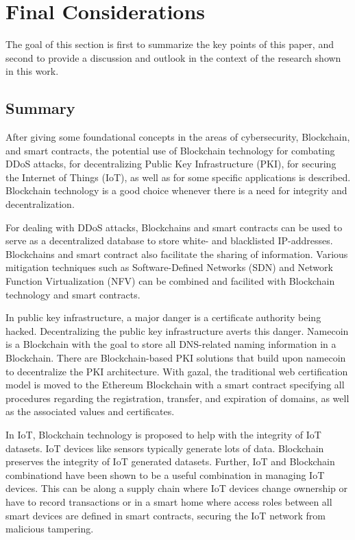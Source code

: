 \section{Final Considerations}

The goal of this section is first to summarize the key points of this paper, and second to provide a discussion and outlook in the context of the research shown in this work.

\subsection{Summary}

After giving some foundational concepts in the areas of cybersecurity, Blockchain, and smart contracts, the potential use of Blockchain technology for combating DDoS attacks, for decentralizing Public Key Infrastructure (PKI), for securing the Internet of Things (IoT), as well as for some specific applications is described. Blockchain technology is a good choice whenever there is a need for integrity and decentralization.

For dealing with DDoS attacks, Blockchains and smart contracts can be used to serve as a decentralized database to store white- and blacklisted IP-addresses. Blockchains and smart contract also facilitate the sharing of information.
Various mitigation techniques such as Software-Defined Networks (SDN) and Network Function Virtualization (NFV) can be combined and facilited with Blockchain technology and smart contracts.

In public key infrastructure, a major danger is a certificate authority being hacked. Decentralizing the public key infrastructure averts this danger. Namecoin is a Blockchain with the goal to store all DNS-related naming information in a Blockchain. There are Blockchain-based PKI solutions that build upon namecoin to decentralize the PKI architecture.
With gazal, the traditional web certification model is moved to the Ethereum Blockchain with a smart contract specifying all procedures regarding the registration, transfer, and expiration of domains, as well as the associated values and certificates.

In IoT, Blockchain technology is proposed to help with the integrity of IoT datasets. IoT devices like sensors typically generate lots of data. Blockchain preserves the integrity of IoT generated datasets. Further, IoT and Blockchain combinationd have been shown to be a useful
combination in managing IoT devices. This can be along a supply chain where IoT devices change ownership or have to record transactions or in a smart home
where access roles between all smart devices are defined in smart contracts, securing the IoT network from malicious tampering.

